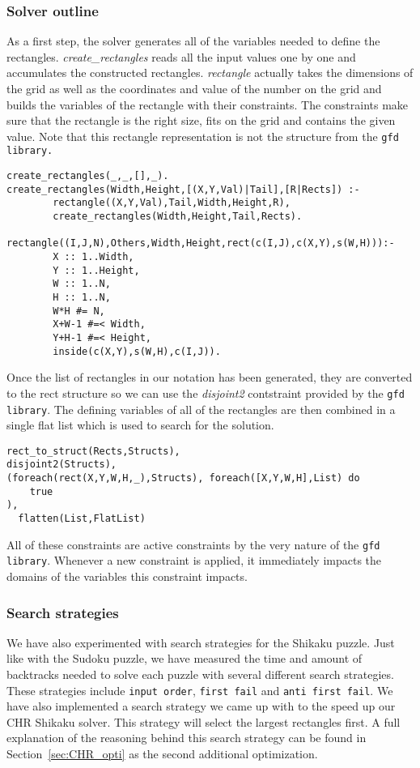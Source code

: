 \subsubsection{Solver outline}
As a first step, the solver generates all of the variables needed to define the rectangles. \textsl{create\_rectangles} reads all the input values one by one and accumulates the constructed rectangles. \textsl{rectangle} actually takes the dimensions of the grid as well as the coordinates and value of the number on the grid and builds the variables of the rectangle with their constraints. The constraints make sure that the rectangle is the right size, fits on the grid and contains the given value. Note that this rectangle representation is not the structure from the \texttt{gfd library.}
\begin{lstlisting}
create_rectangles(_,_,[],_).
create_rectangles(Width,Height,[(X,Y,Val)|Tail],[R|Rects]) :-
        rectangle((X,Y,Val),Tail,Width,Height,R),
        create_rectangles(Width,Height,Tail,Rects).

rectangle((I,J,N),Others,Width,Height,rect(c(I,J),c(X,Y),s(W,H))):-
        X :: 1..Width,
        Y :: 1..Height,
        W :: 1..N,
        H :: 1..N,
        W*H #= N,
        X+W-1 #=< Width,
        Y+H-1 #=< Height,
        inside(c(X,Y),s(W,H),c(I,J)).
\end{lstlisting}

Once the list of rectangles in our notation has been generated, they are converted to the rect structure so we can use the \textsl{disjoint2} contstraint provided by the \texttt{gfd library}. The defining variables of all of the rectangles are then combined in a single flat list which is used to search for the solution.

\begin{lstlisting}
rect_to_struct(Rects,Structs),
disjoint2(Structs),
(foreach(rect(X,Y,W,H,_),Structs), foreach([X,Y,W,H],List) do
  	true
),
  flatten(List,FlatList)
\end{lstlisting}

All of these constraints are active constraints by the very nature of the \texttt{gfd library}. Whenever a new constraint is applied, it immediately impacts the domains of the variables this constraint impacts.
\subsubsection{Search strategies}
We have also experimented with search strategies for the Shikaku puzzle. Just like with the Sudoku puzzle, we have measured the time and amount of backtracks needed to solve each puzzle with several different search strategies. These strategies include \texttt{input order}, \texttt{first fail} and \texttt{anti first fail}. We have also implemented a search strategy we came up with to the speed up our CHR Shikaku solver. This strategy will select the largest rectangles first. A full explanation of the reasoning behind this search strategy can be found in Section~\ref{sec:CHR_opti} as the second additional optimization.

